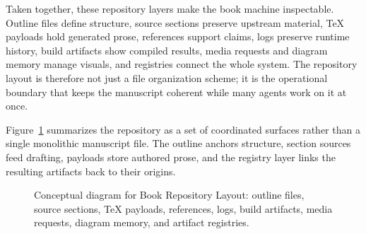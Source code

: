 \documentclass[11pt]{article}
\begin{document}
Taken together, these repository layers make the book machine inspectable. Outline files define structure, source sections preserve upstream material, \TeX{} payloads hold generated prose, references support claims, logs preserve runtime history, build artifacts show compiled results, media requests and diagram memory manage visuals, and registries connect the whole system. The repository layout is therefore not just a file organization scheme; it is the operational boundary that keeps the manuscript coherent while many agents work on it at once.

Figure~\ref{fig:ch03_sec03_repository_layout} summarizes the repository as a set of coordinated surfaces rather than a single monolithic manuscript file. The outline anchors structure, section sources feed drafting, payloads store authored prose, and the registry layer links the resulting artifacts back to their origins.

\begin{figure}[htbp]
\centering

\caption{Conceptual diagram for Book Repository Layout: outline files, source sections, \TeX{} payloads, references, logs, build artifacts, media requests, diagram memory, and artifact registries.}
\label{fig:ch03_sec03_repository_layout}
\end{figure}
\end{document}
